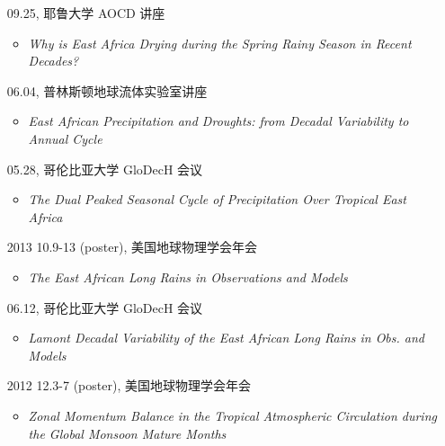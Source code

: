 \documentclass[11pt]{article}
\newcommand{\meetingName}[1]{#1}
\newcommand{\ptitle}[1]{\textit{#1}}
\begin{document}
\begin{CJK*}{UTF8}{gkai}
\begin{itemize}[leftmargin=10ex,label={},noitemsep,nolistsep]
	\item[\phantom{2014}] 09.25, \meetingName{耶鲁大学 AOCD 讲座 }
	 \begin{itemize}[leftmargin=4ex,label={},noitemsep,nolistsep]
		\item \ptitle{Why is East Africa Drying during the Spring Rainy Season in Recent Decades?}
		\end{itemize}

	\item [\phantom{2014}]06.04,  \meetingName{普林斯顿地球流体实验室讲座}
	 \begin{itemize}[leftmargin=4ex,label={},noitemsep,nolistsep]
		\item \ptitle{East African Precipitation and Droughts: from Decadal Variability to Annual Cycle}
		\end{itemize}

	\item[\phantom{2014}]05.28,  \meetingName{哥伦比亚大学 GloDecH 会议}
	\begin{itemize}[leftmargin=4ex,label={},noitemsep,nolistsep]
		\item \ptitle{The Dual Peaked Seasonal Cycle of Precipitation Over Tropical East Africa}
		\end{itemize}
	
	\item[2013] 10.9-13 (poster), \meetingName{美国地球物理学会年会}
	\begin{itemize}[leftmargin=4ex,label={},noitemsep,nolistsep]
		\item \ptitle{The East African Long Rains in Observations and Models}
		\end{itemize}
	
	\item [\phantom{2013}] 06.12, \meetingName{哥伦比亚大学 GloDecH 会议}
	\begin{itemize}[leftmargin=4ex,label={},noitemsep,nolistsep]
		\item \ptitle{Lamont Decadal Variability of the East African Long Rains in Obs. and Models}
		\end{itemize}
			
	\item [2012] 12.3-7 (poster), \meetingName{美国地球物理学会年会}
	\begin{itemize}[leftmargin=4ex,label={},noitemsep,nolistsep]
		\item \ptitle{Zonal Momentum Balance in the Tropical Atmospheric Circulation during the Global Monsoon Mature Months}
		\end{itemize}
	

\end{itemize}
\end{CJK*}
\end{document}
